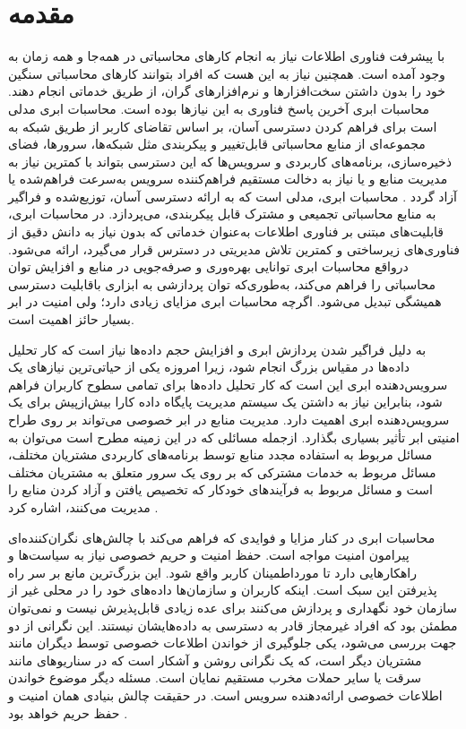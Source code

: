 \documentclass[a4paper,oneside,12pt]{report}
\begin{document}
\section{مقدمه}
با پیشرفت فناوری اطلاعات نیاز به انجام کارهای محاسباتی در همه‌جا و همه زمان به وجود آمده است. همچنین نیاز به این هست که افراد بتوانند کارهای محاسباتی سنگین خود را بدون داشتن سخت‌افزارها و نرم‌افزارهای گران، از طریق خدماتی انجام دهند. محاسبات ابری آخرین پاسخ فناوری به این نیازها بوده است. محاسبات ابری مدلی است برای فراهم کردن دسترسی آسان، بر اساس تقاضای کاربر از طریق شبکه به مجموعه‌ای از منابع محاسباتی قابل‌تغییر و پیکربندی مثل شبکه‌ها، سرورها، فضای ذخیره‌سازی، برنامه‌های کاربردی و سرویس‌ها که این دسترسی بتواند با کمترین نیاز به مدیریت منابع و یا نیاز به دخالت مستقیم فراهم‌کننده سرویس به‌سرعت فراهم‌شده یا آزاد گردد
\cite{1}. 
محاسبات ابری، مدلی است که به ارائه دسترسی آسان، توزیع‌شده و فراگیر به منابع محاسباتی تجمیعی و مشترک قابل پیکربندی، می‌پردازد. در محاسبات ابری، قابلیت‌های مبتنی بر فناوری اطلاعات به‌عنوان خدماتی که بدون نیاز به دانش دقیق از فناوری‌های زیرساختی و کمترین تلاش مدیریتی در دسترس قرار می‌گیرد، ارائه می‌شود. درواقع محاسبات ابری توانایی بهره‌وری و صرفه‌جویی در منابع 
و افزایش توان محاسباتی را فراهم می‌کند، به‌طوری‌که توان پردازشی به ابزاری باقابلیت دسترسی هميشگی تبدیل می‌شود. اگرچه محاسبات ابری مزایای زیادی دارد؛ ولی امنيت در ابر بسيار حائز اهميت است.

 به دليل فراگير شدن پردازش ابری%
 و افزایش حجم داده‌ها نیاز است که کار تحلیل داده‌ها در مقیاس بزرگ انجام شود، زیرا امروزه یکی از حیاتی‌ترین نیازهای یک سرویس‌دهنده ابری این است که کار تحلیل داده‌ها برای تمامی سطوح کاربران فراهم شود، بنابراین نیاز به داشتن یک سیستم مدیریت پایگاه داده کارا بیش‌ازپیش برای یک سرویس‌دهنده ابری اهمیت دارد. مدیریت منابع در ابر خصوصی می‌تواند بر روی طراح امنیتی ابر تأثیر بسیاری بگذارد. ازجمله مسائلی که در این زمینه مطرح است می‌توان به مسائل مربوط به استفاده مجدد منابع توسط برنامه‌های کاربردی مشتریان مختلف، مسائل مربوط به خدمات مشترکی که بر روی یک سرور متعلق به مشتریان مختلف است و مسائل مربوط به فرآیندهای خودکار که تخصیص یافتن و آزاد کردن منابع را مدیریت می‌کنند، اشاره کرد
 \cite{2}.
 
محاسبات ابری در کنار مزایا و فوایدی که فراهم می‌کند با چالش‌های نگران‌کننده‌ای پیرامون امنیت مواجه است. حفظ امنیت و حریم خصوصی نیاز به سیاست‌ها و راهکارهایی دارد تا مورداطمینان کاربر واقع شود. این بزرگ‌ترین مانع بر سر راه پذیرفتن این سبک است. اینکه کاربران و سازمان‌ها داده‌های خود را در محلی غیر از سازمان خود نگهداری و پردازش می‌کنند برای عده زیادی قابل‌پذیرش نیست و نمی‌توان مطمئن بود که افراد غیرمجاز قادر به دسترسی به داده‌هایشان نیستند. این نگرانی از دو جهت بررسی می‌شود، یکی جلوگیری از خواندن اطلاعات خصوصی توسط دیگران مانند مشتریان دیگر است، که یک نگرانی روشن و آشکار است که در سناریوهای مانند سرقت یا سایر حملات مخرب مستقیم نمایان است. مسئله دیگر موضوع خواندن اطلاعات خصوصی ارائه‌دهنده سرویس است. در حقیقت چالش بنیادی همان امنیت و حفظ حریم خواهد بود
\cite{3}.
\end{document}
